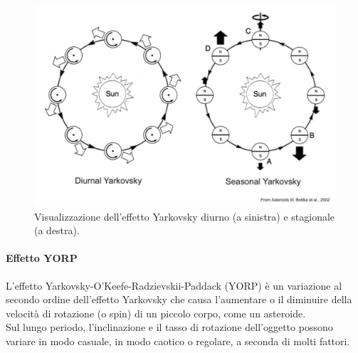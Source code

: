 \documentclass[a4paper,11pt,openright]{book}
\begin{document}
\begin{figure}[!h]
    \centering
    \includegraphics[scale=0.38]{figure/yark.jpg}
    \caption[Visualizzazione dell'effetto Yarkovsky diurno e stagionale.]{Visualizzazione dell'effetto Yarkovsky diurno (a sinistra) e stagionale (a destra). \citep{bottke_yarkovsky_2002}}
    \label{fig:yark}
\end{figure}

\paragraph*{Effetto YORP}
L’effetto Yarkovsky-O'Keefe-Radzievskii-Paddack (YORP) è un variazione al secondo ordine dell’effetto Yarkovsky che causa l’aumentare o il diminuire della velocità di rotazione (o spin) di un piccolo corpo, come un asteroide.\\
Sul lungo periodo, l'inclinazione e il tasso di rotazione dell'oggetto possono variare in modo casuale, in modo caotico o regolare, a seconda di molti fattori.
\end{document}
